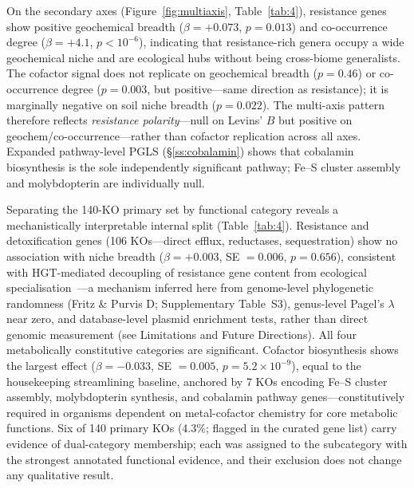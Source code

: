 \documentclass[times]{zHenriquesLab-StyleBioRxiv}
\begin{document}
On the secondary axes (Figure~\ref{fig:multiaxis}, Table~\ref{tab:4}),
resistance genes show positive geochemical breadth ($\beta = +0.073$,
$p = 0.013$) and co-occurrence degree ($\beta = +4.1$, $p < 10^{-6}$),
indicating that resistance-rich genera occupy a wide geochemical niche and
are ecological hubs without being cross-biome generalists. The cofactor
signal does not replicate on geochemical breadth ($p = 0.46$) or
co-occurrence degree ($p = 0.003$, but positive---same direction as
resistance); it is marginally negative on soil niche breadth ($p = 0.022$).
The multi-axis pattern therefore reflects \emph{resistance polarity}---null
on Levins' $B$ but positive on geochem/co-occurrence---rather than cofactor
replication across all axes. Expanded pathway-level PGLS
(\S\ref{ss:cobalamin}) shows that cobalamin biosynthesis is the sole
independently significant pathway; Fe--S cluster assembly and molybdopterin
are individually null.

Separating the 140-KO primary set by functional category reveals a
mechanistically interpretable internal split (Table~\ref{tab:4}). Resistance
and detoxification genes (106 KOs---direct efflux, reductases, sequestration)
show no association with niche breadth ($\beta = +0.003$, SE $= 0.006$,
$p = 0.656$), consistent with HGT-mediated decoupling of resistance gene
content from ecological specialisation~\cite{pal2015,gios2025}---a mechanism
inferred here from genome-level phylogenetic randomness (Fritz \& Purvis D;
Supplementary Table~S3), genus-level Pagel's $\lambda$ near zero, and
database-level plasmid enrichment tests, rather than direct genomic measurement
(see Limitations and Future Directions). All four
metabolically constitutive categories are significant. Cofactor biosynthesis
shows the largest effect ($\beta = -0.033$, SE $= 0.005$, $p = 5.2 \times
10^{-9}$), equal to the housekeeping streamlining baseline, anchored by 7 KOs
encoding Fe--S cluster assembly, molybdopterin synthesis, and cobalamin
pathway genes---constitutively required in organisms dependent on
metal-cofactor chemistry for core metabolic functions. Six of 140 primary KOs
(4.3\%; flagged in the curated gene list) carry evidence of dual-category
membership; each was assigned to the subcategory with the strongest annotated
functional evidence, and their exclusion does not change any qualitative result.
\end{document}
